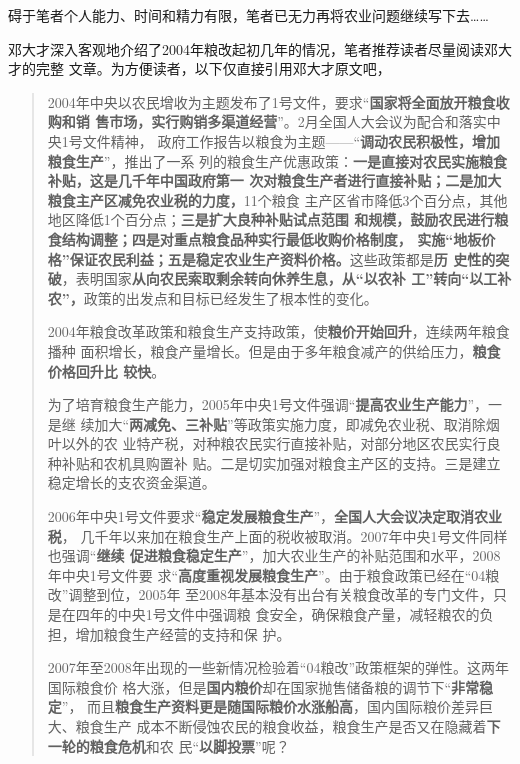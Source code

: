 碍于笔者个人能力、时间和精力有限，笔者已无力再将农业问题继续写下去……

邓大才深入客观地介绍了2004年粮改起初几年的情况，笔者推荐读者尽量阅读邓大才的完整
文章。为方便读者，以下仅直接引用邓大才原文吧，
\begin{quotation}
  2004年中央以农民增收为主题发布了1号文件，要求“\textbf{国家将全面放开粮食收购和销
    售市场，实行购销多渠道经营}”。2月全国人大会议为配合和落实中央1号文件精神，
  政府工作报告以粮食为主题——“\textbf{调动农民积极性，增加粮食生产}”，推出了一系
  列的粮食生产优惠政策：\textbf{一是直接对农民实施粮食补贴，这是几千年中国政府第一
    次对粮食生产者进行直接补贴；二是加大粮食主产区减免农业税的力度，}11个粮食
  主产区省市降低3个百分点，其他地区降低1个百分点；\textbf{三是扩大良种补贴试点范围
    和规模，鼓励农民进行粮食结构调整；四是对重点粮食品种实行最低收购价格制度，
    实施“地板价格”保证农民利益；五是稳定农业生产资料价格。}这些政策都是\textbf{历
    史性的突破}，表明国家\textbf{从向农民索取剩余转向休养生息，从“以农补
    工”转向“以工补农”，}政策的出发点和目标已经发生了根本性的变化。

  2004年粮食改革政策和粮食生产支持政策，使\textbf{粮价开始回升}，连续两年粮食播种
  面积增长，粮食产量增长。但是由于多年粮食减产的供给压力，\textbf{粮食价格回升比
    较快}。

  为了培育粮食生产能力，2005年中央1号文件强调“\textbf{提高农业生产能力}”，一是继
  续加大“\textbf{两减免、三补贴}”等政策实施力度，即减免农业税、取消除烟叶以外的农
  业特产税，对种粮农民实行直接补贴，对部分地区农民实行良种补贴和农机具购置补
  贴。二是切实加强对粮食主产区的支持。三是建立稳定增长的支农资金渠道。

  2006年中央1号文件要求“\textbf{稳定发展粮食生产}”，\textbf{全国人大会议决定取消农业税}，
  几千年以来加在粮食生产上面的税收被取消。2007年中央1号文件同样也强调“\textbf{继续
    促进粮食稳定生产}”，加大农业生产的补贴范围和水平，2008年中央1号文件要
  求“\textbf{高度重视发展粮食生产}”。由于粮食政策已经在“04粮改”调整到位，2005年
  至2008年基本没有出台有关粮食改革的专门文件，只是在四年的中央1号文件中强调粮
  食安全，确保粮食产量，减轻粮农的负担，增加粮食生产经营的支持和保
  护。\cite{dacailianggai}

  2007年至2008年出现的一些新情况检验着“04粮改”政策框架的弹性。这两年国际粮食价
  格大涨，但是\textbf{国内粮价}却在国家抛售储备粮的调节下“\textbf{非常稳定}”，
  而且\textbf{粮食生产资料更是随国际粮价水涨船高}，国内国际粮价差异巨大、粮食生产
  成本不断侵蚀农民的粮食收益，粮食生产是否又在隐藏着\textbf{下一轮的粮食危机}和农
  民“\textbf{以脚投票}”呢？
\end{quotation}



